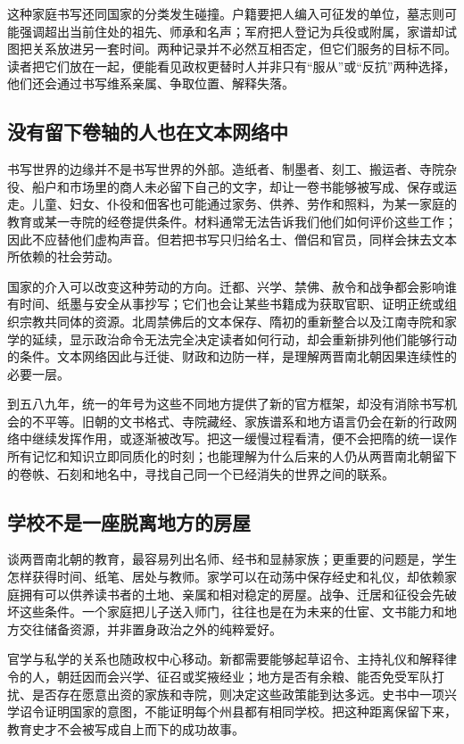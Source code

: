 这种家庭书写还同国家的分类发生碰撞。户籍要把人编入可征发的单位，墓志则可能强调超出当前住处的祖先、师承和名声；军府把人登记为兵役或附属，家谱却试图把关系放进另一套时间。两种记录并不必然互相否定，但它们服务的目标不同。读者把它们放在一起，便能看见政权更替时人并非只有“服从”或“反抗”两种选择，他们还会通过书写维系亲属、争取位置、解释失落。

\subsection{没有留下卷轴的人也在文本网络中}

书写世界的边缘并不是书写世界的外部。造纸者、制墨者、刻工、搬运者、寺院杂役、船户和市场里的商人未必留下自己的文字，却让一卷书能够被写成、保存或运走。儿童、妇女、仆役和佃客也可能通过家务、供养、劳作和照料，为某一家庭的教育或某一寺院的经卷提供条件。材料通常无法告诉我们他们如何评价这些工作；因此不应替他们虚构声音。但若把书写只归给名士、僧侣和官员，同样会抹去文本所依赖的社会劳动。

国家的介入可以改变这种劳动的方向。迁都、兴学、禁佛、赦令和战争都会影响谁有时间、纸墨与安全从事抄写；它们也会让某些书籍成为获取官职、证明正统或组织宗教共同体的资源。北周禁佛后的文本保存、隋初的重新整合以及江南寺院和家学的延续，显示政治命令无法完全决定读者如何行动，却会重新排列他们能够行动的条件。文本网络因此与迁徙、财政和边防一样，是理解两晋南北朝因果连续性的必要一层。

到五八九年，统一的年号为这些不同地方提供了新的官方框架，却没有消除书写机会的不平等。旧朝的文书格式、寺院藏经、家族谱系和地方语言仍会在新的行政网络中继续发挥作用，或逐渐被改写。把这一缓慢过程看清，便不会把隋的统一误作所有记忆和知识立即同质化的时刻；也能理解为什么后来的人仍从两晋南北朝留下的卷帙、石刻和地名中，寻找自己同一个已经消失的世界之间的联系。

\subsection{学校不是一座脱离地方的房屋}

谈两晋南北朝的教育，最容易列出名师、经书和显赫家族；更重要的问题是，学生怎样获得时间、纸笔、居处与教师。家学可以在动荡中保存经史和礼仪，却依赖家庭拥有可以供养读书者的土地、亲属和相对稳定的房屋。战争、迁居和征役会先破坏这些条件。一个家庭把儿子送入师门，往往也是在为未来的仕宦、文书能力和地方交往储备资源，并非置身政治之外的纯粹爱好。

官学与私学的关系也随政权中心移动。新都需要能够起草诏令、主持礼仪和解释律令的人，朝廷因而会兴学、征召或奖掖经业；地方是否有余粮、能否免受军队打扰、是否存在愿意出资的家族和寺院，则决定这些政策能到达多远。史书中一项兴学诏令证明国家的意图，不能证明每个州县都有相同学校。把这种距离保留下来，教育史才不会被写成自上而下的成功故事。


